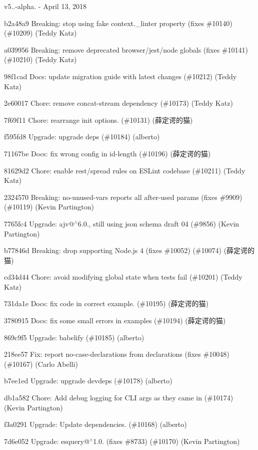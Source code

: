 v5..-\/alpha. -\/ April 13, 2018


\begin{DoxyItemize}
\item b2a48a9 Breaking\+: stop using fake {\ttfamily context.\+\_\+linter} property (fixes \#10140) (\#10209) (Teddy Katz)
\item a039956 Breaking\+: remove deprecated browser/jest/node globals (fixes \#10141) (\#10210) (Teddy Katz)
\item 98f1cad Docs\+: update migration guide with latest changes (\#10212) (Teddy Katz)
\item 2e60017 Chore\+: remove concat-\/stream dependency (\#10173) (Teddy Katz)
\item 7f69f11 Chore\+: rearrange init options. (\#10131) (薛定谔的猫)
\item f595fd8 Upgrade\+: upgrade deps (\#10184) (alberto)
\item 71167be Docs\+: fix wrong config in id-\/length (\#10196) (薛定谔的猫)
\item 81629d2 Chore\+: enable rest/spread rules on E\+S\+Lint codebase (\#10211) (Teddy Katz)
\item 2324570 Breaking\+: no-\/unused-\/vars reports all after-\/used params (fixes \#9909) (\#10119) (Kevin Partington)
\item 7765fc4 Upgrade\+: ajv@$^\wedge$6.0., still using json schema draft 04 (\#9856) (Kevin Partington)
\item b77846d Breaking\+: drop supporting Node.\+js 4 (fixes \#10052) (\#10074) (薛定谔的猫)
\item cd34d44 Chore\+: avoid modifying global state when tests fail (\#10201) (Teddy Katz)
\item 731da1e Docs\+: fix code in correct example. (\#10195) (薛定谔的猫)
\item 3780915 Docs\+: fix some small errors in examples (\#10194) (薛定谔的猫)
\item 869c9f5 Upgrade\+: babelify (\#10185) (alberto)
\item 218ee57 Fix\+: report no-\/case-\/declarations from declarations (fixes \#10048) (\#10167) (Carlo Abelli)
\item b7ee1ed Upgrade\+: upgrade devdeps (\#10178) (alberto)
\item db1a582 Chore\+: Add debug logging for C\+LI args as they came in (\#10174) (Kevin Partington)
\item f3a0291 Upgrade\+: Update dependencies. (\#10168) (alberto)
\item 7d6e052 Upgrade\+: esquery@$^\wedge$1.0. (fixes \#8733) (\#10170) (Kevin Partington)

\end{DoxyItemize}
